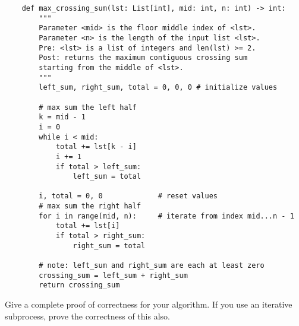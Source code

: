 \newpage
    
        \begin{verbatim}
    def max_crossing_sum(lst: List[int], mid: int, n: int) -> int:
        """
        Parameter <mid> is the floor middle index of <lst>.
        Parameter <n> is the length of the input list <lst>.
        Pre: <lst> is a list of integers and len(lst) >= 2.
        Post: returns the maximum contiguous crossing sum 
        starting from the middle of <lst>.
        """
        left_sum, right_sum, total = 0, 0, 0 # initialize values
    
        # max sum the left half
        k = mid - 1
        i = 0
        while i < mid:
            total += lst[k - i]
            i += 1
            if total > left_sum:
                left_sum = total
    
        i, total = 0, 0             # reset values
        # max sum the right half
        for i in range(mid, n):     # iterate from index mid...n - 1
            total += lst[i]
            if total > right_sum:
                right_sum = total
    
        # note: left_sum and right_sum are each at least zero
        crossing_sum = left_sum + right_sum
        return crossing_sum
    \end{verbatim}

\newpage

    Give a complete proof of correctness for your algorithm.
    If you use an iterative subprocess, prove the correctness of this also.
    
